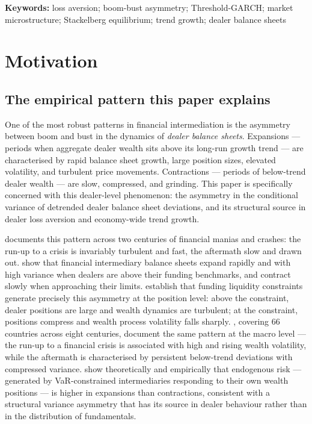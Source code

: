 \documentclass[12pt,a4paper]{article}
\theoremstyle{definition}
\begin{document}
\noindent\textbf{Keywords:} loss aversion; boom-bust asymmetry; Threshold-GARCH; market microstructure; Stackelberg equilibrium; trend growth; dealer balance sheets

\newpage


\section{Motivation}
\label{sec:motivation}

\subsection{The empirical pattern this paper explains}
\label{sec:pattern}

One of the most robust patterns in financial intermediation is the asymmetry between
boom and bust in the dynamics of \emph{dealer balance sheets}. Expansions ---
periods when aggregate dealer wealth sits above its long-run growth trend ---
are characterised by rapid balance sheet growth, large position sizes, elevated
volatility, and turbulent price movements. Contractions --- periods of
below-trend dealer wealth --- are slow, compressed, and grinding. This paper
is specifically concerned with this dealer-level phenomenon: the asymmetry
in the conditional variance of detrended dealer balance sheet deviations,
and its structural source in dealer loss aversion and economy-wide trend growth.

\citet{kindleberger1978} documents this pattern across two centuries of financial
manias and crashes: the run-up to a crisis is invariably turbulent and fast,
the aftermath slow and drawn out. \citet{adrian2010} show that financial intermediary balance sheets expand rapidly and with high variance when dealers
are above their funding benchmarks, and contract slowly when approaching their
limits. \citet{brunnermeier2009} establish that funding liquidity
constraints generate precisely this asymmetry at the position level: above
the constraint, dealer positions are large and wealth dynamics are turbulent;
at the constraint, positions compress and wealth process volatility falls
sharply. \citet{reinhart2009}, covering 66 countries across eight
centuries, document the same pattern at the macro level --- the run-up to a
financial crisis is associated with high and rising wealth volatility, while
the aftermath is characterised by persistent below-trend deviations with
compressed variance. \citet{danielsson2008} show theoretically and
empirically that endogenous risk --- generated by VaR-constrained intermediaries
responding to their own wealth positions --- is higher in expansions than
contractions, consistent with a structural variance asymmetry that has its
source in dealer behaviour rather than in the distribution of fundamentals.
\end{document}
